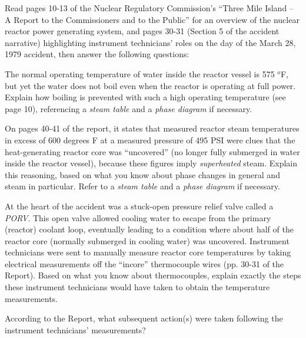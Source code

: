

Read pages 10-13 of the Nuclear Regulatory Commission's ``Three Mile Island -- A Report to the Commissioners and to the Public'' for an overview of the nuclear reactor power generating system, and pages 30-31 (Section 5 of the accident narrative) highlighting instrument technicians' roles on the day of the March 28, 1979 accident, then answer the following questions:

\vskip 10pt

The normal operating temperature of water inside the reactor vessel is 575 $^{o}$F, but yet the water does not boil even when the reactor is operating at full power.  Explain how boiling is prevented with such a high operating temperature (see page 10), referencing a {\it steam table} and a {\it phase diagram }if necessary.

\vskip 10pt

On pages 40-41 of the report, it states that measured reactor steam temperatures in excess of 600 degrees F at a measured pressure of 495 PSI were clues that the heat-generating reactor core was ``uncovered'' (no longer fully submerged in water inside the reactor vessel), because these figures imply {\it superheated} steam.  Explain this reasoning, based on what you know about phase changes in general and steam in particular.  Refer to a {\it steam table} and a {\it phase diagram} if necessary.

\vskip 10pt

At the heart of the accident was a stuck-open pressure relief valve called a {\it PORV}.  This open valve allowed cooling water to escape from the primary (reactor) coolant loop, eventually leading to a condition where about half of the reactor core (normally submerged in cooling water) was uncovered.  Instrument technicians were sent to manually measure reactor core temperatures by taking electrical measurements off the ``incore'' thermocouple wires (pp. 30-31 of the Report).  Based on what you know about thermocouples, explain exactly the steps these instrument technicians would have taken to obtain the temperature measurements.

\vskip 10pt

According to the Report, what subsequent action(s) were taken following the instrument technicians' measurements?

